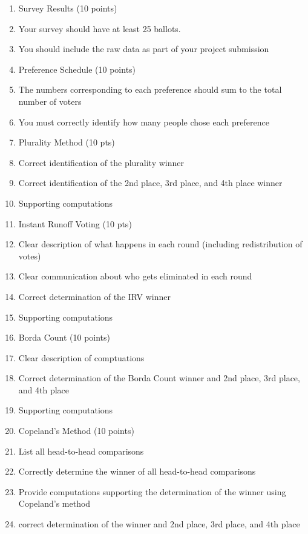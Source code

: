\begin{enumerate}
\item Survey Results (10 points)
\bi
\item Your survey should have at least 25 ballots.
\item You should include the raw data as part of your project submission
\ei
\item Preference Schedule (10 points)
\bi
\item The numbers corresponding to each preference should sum to the total number of voters
\item You must correctly identify how many people chose each preference
\ei

\item Plurality Method (10 pts)

\bi
\item Correct identification of the plurality winner
\item Correct identification of the 2nd place, 3rd place, and 4th place winner
\item Supporting computations
\ei

\item Instant Runoff Voting (10 pts)
\bi
\item Clear description of what happens in each round (including redistribution of votes)
\item Clear communication about who gets eliminated in each round
\item Correct determination of the IRV winner 
\item Supporting computations
\ei

\item Borda Count (10 points)
\bi
\item Clear description of comptuations
\item Correct determination of the Borda Count winner and  2nd place, 3rd place, and 4th place 
\item Supporting computations
\ei

\item Copeland's Method (10 points)
\bi
\item List all head-to-head comparisons
\item Correctly determine the winner of all head-to-head comparisons
\item Provide computations supporting the determination of the winner using Copeland's method
\item correct determination of the winner and  2nd place, 3rd place, and 4th place 
\ei


\end{enumerate}
